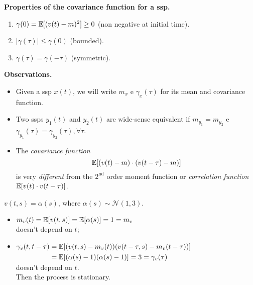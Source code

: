 \textbf{Properties of the covariance function for a \gls{ssp}.}
\begin{enumerate}
	\item $\gamma(0)=\mathbb{E}[(v(t)-m)^{2}] \geq 0$ (non negative at initial time).
	\item $|\gamma(\tau)| \leq \gamma(0)$ (bounded).
	\item $\gamma(\tau)=\gamma(-\tau)$ (symmetric).
\end{enumerate}

\newpage
\textbf{Observations.}
\begin{itemize}
    \item Given a \gls{ssp} $x(t)$, we will write $m_{x}$ e $\gamma_{x}(\tau)$ for its mean and covariance function.
    \item Two \glspl{ssp} $y_{1}(t)$ and $y_{2}(t)$ are wide-sense equivalent if $m_{y_{1}}=m_{y_{2}}$ e $\gamma_{y_{1}}(\tau)=\gamma_{y_{2}}(\tau), \forall \tau$.
    \item The \emph{covariance function}
$$
	\mathbb{E}[(v(t)-m) \cdot(v(t-\tau)-m)]
$$
is very \emph{different} from the $2^{\text{nd}}$ order moment function or \emph{correlation function} $\mathbb{E}[v(t) \cdot v(t-\tau)]$.
\end{itemize}

\begin{exa}
$\boxed{v(t,s)=\alpha (s)}$, where $\alpha (s)\sim \mathcal{N}(1,3)$.

\begin{itemize}
	\item $m_{v}(t)=\mathbb{E}[v(t, s)]=\mathbb{E}[\alpha(s)]=1=m_{v}$\\
	doesn't depend on $t$;
	\item $\begin{aligned}[t]
		\gamma_{v}(t, t-\tau)&=\mathbb{E}[(v(t, s)-m_{v}(t))(v(t-\tau, s)-m_{v}(t-\tau))]\\
		&=\mathbb{E}[(\alpha(s)-1)(\alpha(s)-1)]=3=\gamma_{v}(\tau)
	\end{aligned}$\\
	doesn't depend on $t$.\\
	Then the process is stationary.
\end{itemize}
\end{exa}

